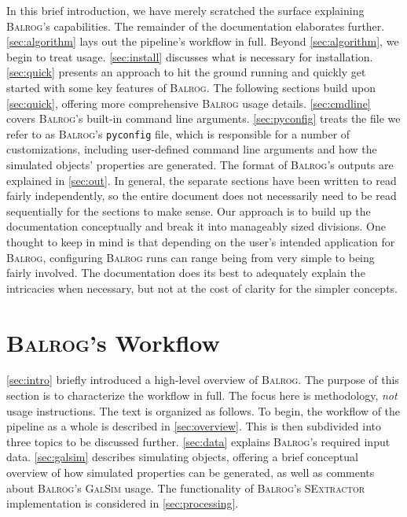 \documentclass[11pt]{book}
\newcommand{\codett}[1]{\texttt{#1}}
\newcommand{\pyconfig}{\codett{pyconfig}}
\newcommand{\galsim}{\textsc{GalSim}}
\newcommand{\balrog}{\textsc{Balrog}}
\newcommand{\sex}{\textsc{SExtractor}}
\begin{document}
In this brief introduction, we have merely scratched the surface explaining \balrog{}'s capabilities. 
The remainder of the documentation elaborates further.
\autoref{sec:algorithm} lays out the pipeline's workflow in full.
Beyond \autoref{sec:algorithm}, we begin to treat usage.
\autoref{sec:install} discusses what is necessary for installation.
\autoref{sec:quick} presents an approach to hit the ground running and quickly get started with some key features of \balrog{}.
The following sections build upon \autoref{sec:quick}, offering more comprehensive \balrog{} usage details.
\autoref{sec:cmdline} covers \balrog{}'s built-in command line arguments.
\autoref{sec:pyconfig} treats the file we refer to as \balrog{}'s \pyconfig{} file, which is responsible for a number of customizations,
including user-defined command line arguments and how the simulated objects' properties are generated.
The format of \balrog{}'s outputs are explained in \autoref{sec:out}.
In general, the separate sections have been written to read fairly independently,
so the entire document does not necessarily need to be read sequentially for the sections to make sense.
Our approach is to build up the documentation conceptually and break it into manageably sized divisions.
One thought to keep in mind is that depending on the user's intended application for \balrog{},
configuring \balrog{} runs can range being from very simple to being fairly involved.
The documentation does its best to adequately explain the intricacies when necessary,
but not at the cost of clarity for the simpler concepts.


\chapter{\balrog{}'s Workflow}
\label{sec:algorithm}

\autoref{sec:intro} briefly introduced a high-level overview of \balrog{}.
The purpose of this section is to characterize the workflow in full.
The focus here is methodology, \textit{not} usage instructions. 
The text is organized as follows.
To begin, the workflow of the pipeline as a whole is described in \autoref{sec:overview}.
This is then subdivided into three topics to be discussed further.
\autoref{sec:data} explains \balrog{}'s required input data.
\autoref{sec:galsim} describes simulating objects,
offering a brief conceptual overview of how simulated properties can be generated, as well as comments about \balrog{}'s \galsim{} usage.
The functionality of \balrog{}'s \sex{} implementation is considered in \autoref{sec:processing}.
\end{document}
